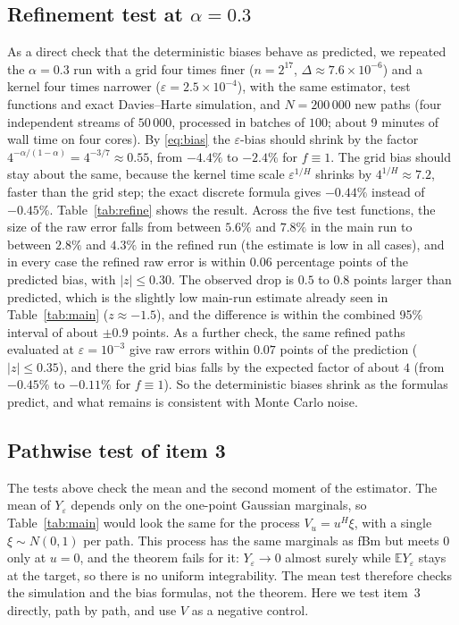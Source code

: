 \documentclass[11pt]{article}
\theoremstyle{remark}
\theoremstyle{definition}
\newcommand{\E}{\mathbb{E}}
\begin{document}
\subsection{Refinement test at $\alpha=0.3$}\label{sec:refine}
As a direct check that the deterministic biases behave as predicted, we repeated the $\alpha=0.3$ run with a grid four times finer ($n=2^{17}$, $\Delta\approx7.6\times10^{-6}$) and a kernel four times narrower ($\varepsilon=2.5\times10^{-4}$), with the same estimator, test functions and exact Davies--Harte simulation, and $N=200\,000$ new paths (four independent streams of $50\,000$, processed in batches of $100$; about 9 minutes of wall time on four cores). By \eqref{eq:bias} the $\varepsilon$-bias should shrink by the factor $4^{-\alpha/(1-\alpha)}=4^{-3/7}\approx0.55$, from $-4.4\%$ to $-2.4\%$ for $f\equiv1$. The grid bias should stay about the same, because the kernel time scale $\varepsilon^{1/H}$ shrinks by $4^{1/H}\approx7.2$, faster than the grid step; the exact discrete formula gives $-0.44\%$ instead of $-0.45\%$. Table~\ref{tab:refine} shows the result. Across the five test functions, the size of the raw error falls from between $5.6\%$ and $7.8\%$ in the main run to between $2.8\%$ and $4.3\%$ in the refined run (the estimate is low in all cases), and in every case the refined raw error is within $0.06$ percentage points of the predicted bias, with $|z|\le0.30$. The observed drop is $0.5$ to $0.8$ points larger than predicted, which is the slightly low main-run estimate already seen in Table~\ref{tab:main} ($z\approx-1.5$), and the difference is within the combined 95\% interval of about $\pm0.9$ points. As a further check, the same refined paths evaluated at $\varepsilon=10^{-3}$ give raw errors within $0.07$ points of the prediction ($|z|\le0.35$), and there the grid bias falls by the expected factor of about $4$ (from $-0.45\%$ to $-0.11\%$ for $f\equiv1$). So the deterministic biases shrink as the formulas predict, and what remains is consistent with Monte Carlo noise.

\subsection{Pathwise test of item 3}\label{sec:pathwise}
The tests above check the mean and the second moment of the estimator. The mean of $Y_\varepsilon$ depends only on the one-point Gaussian marginals, so Table~\ref{tab:main} would look the same for the process $V_u=u^H\xi$, with a single $\xi\sim N(0,1)$ per path. This process has the same marginals as fBm but meets $0$ only at $u=0$, and the theorem fails for it: $Y_\varepsilon\to0$ almost surely while $\E Y_\varepsilon$ stays at the target, so there is no uniform integrability. The mean test therefore checks the simulation and the bias formulas, not the theorem. Here we test item~3 directly, path by path, and use $V$ as a negative control.
\end{document}
